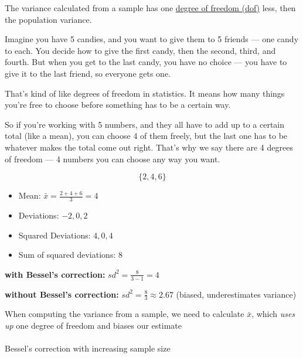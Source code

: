 \documentclass[
  a4paper,
]{scrbook}
\makeatletter
\let\oldparagraph\paragraph
\renewcommand{\paragraph}{
    \@ifstar
      \xxxParagraphStar
      \xxxParagraphNoStar
  }
\newcommand{\xxxParagraphStar}[1]{\oldparagraph*{#1}\mbox{}}
\newcommand{\xxxParagraphNoStar}[1]{\oldparagraph{#1}\mbox{}}
\providecommand{\tightlist}{%
  \setlength{\itemsep}{0pt}\setlength{\parskip}{0pt}}\usepackage{longtable,booktabs,array}
\makeatother
\begin{document}
The variance calculated from a sample has one
\hyperref[acronyms_dof]{degree of freedom (dof)} less, then the
population variance.

Imagine you have 5 candies, and you want to give them to 5 friends ---
one candy to each. You decide how to give the first candy, then the
second, third, and fourth. But when you get to the last candy, you have
no choice --- you have to give it to the last friend, so everyone gets
one.

That's kind of like degrees of freedom in statistics. It means how many
things you're free to choose before something has to be a certain way.

So if you're working with 5 numbers, and they all have to add up to a
certain total (like a mean), you can choose 4 of them freely, but the
last one has to be whatever makes the total come out right. That's why
we say there are 4 degrees of freedom --- 4 numbers you can choose any
way you want.

\[\{2,4,6\}\]

\begin{itemize}
\tightlist
\item
  Mean: \(\bar{x} = \frac{2+4+6}{3} = 4\)
\item
  Deviations: \(-2,0,2\)
\item
  Squared Deviations: \(4,0,4\)
\item
  Sum of squared deviations: \(8\)
\end{itemize}

\textbf{with Bessel's correction: } \(sd^2 = \frac{8}{3-1} = 4\)

\textbf{without Bessel's correction: }
\(sd^2 = \frac{8}{3} \approx 2.67\) (biased, underestimates variance)

When computing the variance from a sample, we need to calculate
\(\bar{x}\), which \emph{uses up} one degree of freedom and biases our
estimate

\paragraph{Bessel's correction with increasing sample
size}\label{bessels-correction-with-increasing-sample-size}
\end{document}
